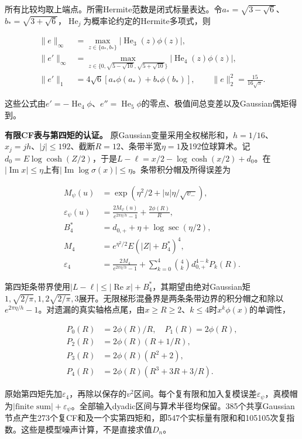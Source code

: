 \documentclass[11pt,a4paper]{article}
\begin{document}
所有比较均取上端点。所需Hermite范数是闭式标量表达。令\(a_*=\sqrt{3-\sqrt6}\)、\(b_*=\sqrt{3+\sqrt6}\)，\(\operatorname{He}_j\)为概率论约定的Hermite多项式，则

\[
\begin{aligned}
\|e\|_\infty&=\max_{z\in\{a_*,b_*\}}|\operatorname{He}_3(z)\phi(z)|,\\
\|e'\|_\infty&=\max_{z\in\{0,\sqrt{5-\sqrt{10}},\sqrt{5+\sqrt{10}}\}}
|\operatorname{He}_4(z)\phi(z)|,\\
\|e'\|_1&=4\sqrt6[a_*\phi(a_*)+b_*\phi(b_*)],\qquad
\|e\|_2^2=\frac{15}{16\sqrt\pi}.
\end{aligned}
\tag{C.46}
\]

这些公式由\(e'=-\operatorname{He}_4\phi\)、\(e''=\operatorname{He}_5\phi\)的零点、极值间总变差以及Gaussian偶矩得到。

\textbf{有限CF表与第四矩的认证。}
原Gaussian变量采用全权梯形和，\(h=1/16\)、\(x_j=jh\)、\(|j|\le192\)、截断\(R=12\)、条带半宽\(\eta=1\)及192位球算术。记\(d_0=E\log\cosh(Z/2)\)，于是\(L-\ell=x/2-\log\cosh(x/2)+d_0\)。在\(|\operatorname{Im}x|\le\eta\)上有\(|\operatorname{Im}\log\sigma(x)|\le\eta\)。条带积分帽及所得误差为

\[
\begin{aligned}
M_\psi(u)&=\exp(\eta^2/2+|u|\eta/\sqrt{v_-}),\\
\varepsilon_\psi(u)&=\frac{2M_\psi(u)}{e^{2\pi\eta/h}-1}+\frac{2\phi(R)}R,\\
B_4^*&=d_{0,+}+\eta+\log\sec(\eta/2),\\
M_4&=e^{\eta^2/2}E(|Z|+B_4^*)^4,\\
\varepsilon_4&=\frac{2M_4}{e^{2\pi\eta/h}-1}
+\sum_{k=0}^4{4\choose k}d_{0,+}^{4-k}P_k(R).
\end{aligned}
\tag{C.47}
\]

第四矩条带界使用\(|L-\ell|\le|\operatorname{Re}x|+B_4^*\)，其期望由绝对Gaussian矩\(1,\sqrt{2/\pi},1,2\sqrt{2/\pi},3\)展开。无限梯形混叠界是两条条带边界的积分帽之和除以\(e^{2\pi\eta/h}-1\)。对遗漏的真实轴格点尾，由\(x\ge R\ge2\)、\(k\le4\)时\(x^k\phi(x)\)的单调性，

\[
\begin{aligned}
P_0(R)&=2\phi(R)/R,\quad P_1(R)=2\phi(R),\\
P_2(R)&=2\phi(R)(R+1/R),\\
P_3(R)&=2\phi(R)(R^2+2),\\
P_4(R)&=2\phi(R)(R^3+3R+3/R).
\end{aligned}
\tag{C.48}
\]

原始第四矩先加\(\varepsilon_4\)，再除以保存的\(v^2\)区间。每个复有限和加入复模误差\(\varepsilon_\psi\)，真模帽为\(|\text{finite sum}|+\varepsilon_\psi\)。全部输入dyadic区间与算术半径均保留。385个共享Gaussian节点产生273个复CF和及一个实第四矩和，即547个实标量有限和和105105次复指数。这些是模型噪声计算，不是直接求值\(D_n\)。
\end{document}
